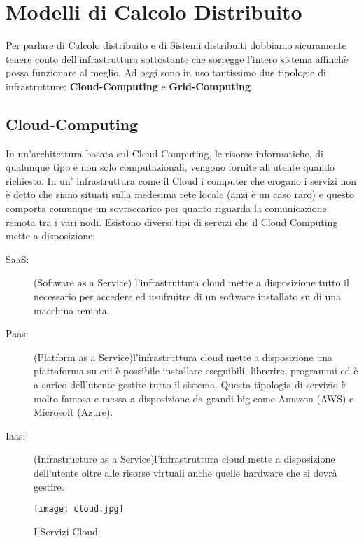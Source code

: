 \section{Modelli di Calcolo Distribuito}
Per parlare di Calcolo distribuito e di Sistemi distribuiti dobbiamo sicuramente tenere conto dell'infrastruttura sottostante che sorregge l'intero sistema affinchè possa funzionare al meglio. Ad oggi sono in uso tantissimo due tipologie di infrastrutture: \textbf{Cloud-Computing} e \textbf{Grid-Computing}.
\subsection{Cloud-Computing}
In un'architettura basata sul Cloud-Computing, le risorse informatiche, di qualunque tipo e non solo computazionali, vengono fornite all'utente quando richiesto. In un' infrastruttura come il Cloud i computer che erogano i servizi non è detto che siano situati sulla medesima rete locale (anzi è un caso raro) e questo comporta comunque un sovraccarico per quanto riguarda la comunicazione remota tra i vari nodi. Esistono diversi tipi di servizi che il Cloud Computing mette a disposizione:
\begin{description}
     \item[SaaS:] (Software as a Service) l'infrastruttura cloud mette a disposizione tutto il necessario per accedere ed usufruitre di un software installato su di una macchina remota.
     \item[Paas:] (Platform as a Service)l'infrastruttura cloud mette a disposizione una piattaforma su cui è possibile installare eseguibili, librerire, programmi ed è a carico dell'utente gestire tutto il sistema. Questa tipologia di servizio è molto famosa e messa a disposizione da grandi big come Amazon (AWS) e Microsoft (Azure).
     \item[Iaas:] (Infrastructure as a Service)l'infrastruttura cloud mette a disposizione dell'utente oltre alle risorse virtuali anche quelle hardware che si dovrà gestire. 
   \end{description}   
\begin{figure}[!ht]
  \begin{center}
    \texttt{[image: cloud.jpg]}
    \caption{I Servizi Cloud}
    \label{fig:cloud}
  \end{center}
\end{figure}
